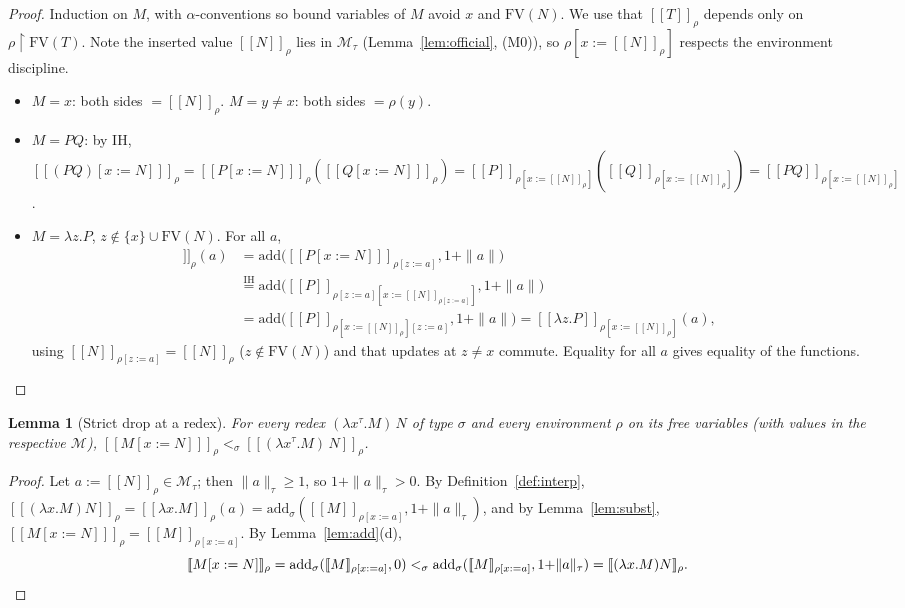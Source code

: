 \documentclass{amsart}
\newtheorem{lemma}{Lemma}
\theoremstyle{definition}
\newcommand{\interp}[1]{[\![#1]\!]}
\newcommand{\FV}{\mathrm{FV}}
\begin{document}
\begin{proof}
Induction on $M$, with $\alpha$-conventions so bound variables of $M$ avoid $x$ and
$\FV(N)$. We use that $\interp{T}_\rho$ depends only on $\rho{\restriction}\FV(T)$. Note the
inserted value $\interp{N}_\rho$ lies in $\mathcal M_\tau$ (Lemma~\ref{lem:official},
(M0)), so $\rho[x:=\interp N_\rho]$ respects the environment discipline.
\begin{itemize}
\item $M=x$: both sides $=\interp N_\rho$. \quad $M=y\neq x$: both sides $=\rho(y)$.
\item $M=PQ$: by IH, $\interp{(PQ)[x:=N]}_\rho=\interp{P[x:=N]}_\rho(\interp{Q[x:=N]}_\rho)
  =\interp{P}_{\rho[x:=\interp N_\rho]}(\interp{Q}_{\rho[x:=\interp N_\rho]})
  =\interp{PQ}_{\rho[x:=\interp N_\rho]}$.
\item $M=\lambda z.P$, $z\notin\{x\}\cup\FV(N)$. For all $a$,
  \begin{align*}
   \interp{(\lambda z.P)[x:=N]}_\rho(a)
   &=\mathrm{add}\bigl(\interp{P[x:=N]}_{\rho[z:=a]},1{+}\|a\|\bigr)\\
   &\overset{\text{IH}}{=}\mathrm{add}\bigl(\interp{P}_{\rho[z:=a][x:=\interp N_{\rho[z:=a]}]},1{+}\|a\|\bigr)\\
   &=\mathrm{add}\bigl(\interp{P}_{\rho[x:=\interp N_\rho][z:=a]},1{+}\|a\|\bigr)
   =\interp{\lambda z.P}_{\rho[x:=\interp N_\rho]}(a),
  \end{align*}
  using $\interp N_{\rho[z:=a]}=\interp N_\rho$ ($z\notin\FV(N)$) and that updates at
  $z\neq x$ commute. Equality for all $a$ gives equality of the functions.
\end{itemize}
\end{proof}

\begin{lemma}[Strict drop at a redex]\label{lem:redex}
For every redex $(\lambda x^\tau.M)\,N$ of type $\sigma$ and every environment $\rho$ on its
free variables (with values in the respective $\mathcal M$),
$\interp{M[x:=N]}_\rho<_\sigma\interp{(\lambda x^\tau.M)\,N}_\rho$.
\end{lemma}

\begin{proof}
Let $a:=\interp N_\rho\in\mathcal M_\tau$; then $\|a\|_\tau\ge1$, so $1+\|a\|_\tau>0$. By
Definition~\ref{def:interp},
$\interp{(\lambda x.M)N}_\rho=\interp{\lambda x.M}_\rho(a)=
\mathrm{add}_\sigma(\interp{M}_{\rho[x:=a]},1{+}\|a\|_\tau)$, and by Lemma~\ref{lem:subst},
$\interp{M[x:=N]}_\rho=\interp{M}_{\rho[x:=a]}$. By Lemma~\ref{lem:add}(d),
\[
  \interp{M[x:=N]}_\rho=\mathrm{add}_\sigma(\interp{M}_{\rho[x:=a]},0)
  <_\sigma\mathrm{add}_\sigma(\interp{M}_{\rho[x:=a]},1{+}\|a\|_\tau)=\interp{(\lambda x.M)N}_\rho.\qedhere
\]
\end{proof}
\end{document}
